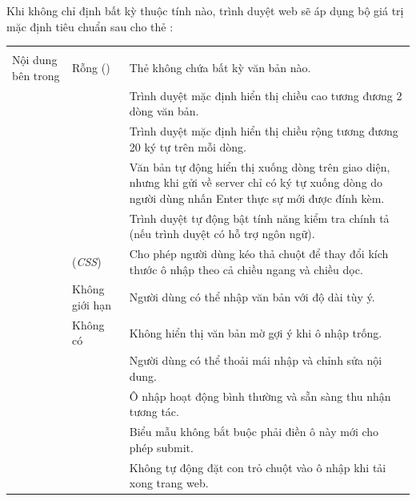 Khi không chỉ định bất kỳ thuộc tính nào, trình duyệt web sẽ áp dụng bộ giá trị mặc định tiêu chuẩn sau cho thẻ :

\begin{prettyTableBox}
\begin{tabularx}{\linewidth}{K{2.8cm} K{3.0cm} Z}
 &  &  \\
Nội dung bên trong & Rỗng () & Thẻ  không chứa bất kỳ văn bản nào. \\
 &  & Trình duyệt mặc định hiển thị chiều cao tương đương 2 dòng văn bản. \\
 &  & Trình duyệt mặc định hiển thị chiều rộng tương đương 20 ký tự trên mỗi dòng. \\
 &  & Văn bản tự động hiển thị xuống dòng trên giao diện, nhưng khi gửi về server chỉ có ký tự xuống dòng do người dùng nhấn Enter thực sự mới được đính kèm. \\
 &  & Trình duyệt tự động bật tính năng kiểm tra chính tả (nếu trình duyệt có hỗ trợ ngôn ngữ). \\
 &  (\textit{CSS}) & Cho phép người dùng kéo thả chuột để thay đổi kích thước ô nhập theo cả chiều ngang và chiều dọc. \\
 & Không giới hạn & Người dùng có thể nhập văn bản với độ dài tùy ý. \\
 & Không có & Không hiển thị văn bản mờ gợi ý khi ô nhập trống. \\
 &  & Người dùng có thể thoải mái nhập và chỉnh sửa nội dung. \\
 &  & Ô nhập hoạt động bình thường và sẵn sàng thu nhận tương tác. \\
 &  & Biểu mẫu không bắt buộc phải điền ô này mới cho phép submit. \\
 &  & Không tự động đặt con trỏ chuột vào ô nhập khi tải xong trang web. \\
\end{tabularx}
\end{prettyTableBox}

